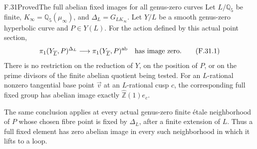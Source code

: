 \begin{statement}{F.31}{Proved}{The full abelian fixed images for all genus-zero curves}
Let $L/\mathbb Q_5$ be finite,
$K_\infty=\mathbb Q_5(\mu_\infty)$, and
$\Delta_L=G_{LK_\infty}$.
Let $Y/L$ be a smooth genus-zero hyperbolic curve
and $P\in Y(L)$.
For the action defined by this actual point section,
\[
 \pi_1(Y_{\overline L},P)^{\Delta_L}
       \longrightarrow \pi_1(Y_{\overline L},P)^{\mathrm{ab}}
       \quad\hbox{has image zero}.                       \tag{F.31.1}
\]
There is no restriction on the reduction of $Y$,
on the position of $P$, or on the prime divisors of
the finite abelian quotient being tested.
For an $L$-rational nonzero tangential base point
$\vec v$ at an $L$-rational cusp $c$, the corresponding
full fixed group has abelian image exactly
$\widehat{\mathbb Z}(1)e_c$.

The same conclusion applies at every actual
genus-zero finite \'etale neighborhood of $P$
whose chosen fibre point is fixed by $\Delta_L$,
after a finite extension of $L$.
Thus a full fixed element has zero abelian image in
every such neighborhood in which it lifts to a loop.
\end{statement}

